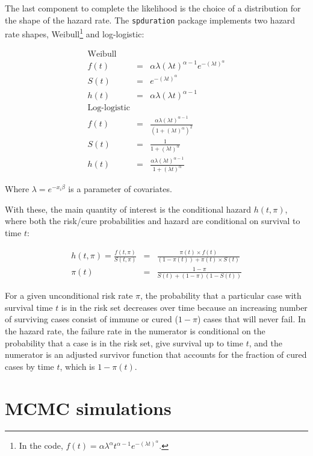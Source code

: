 \documentclass[letter]{article}
\begin{document}
The last component to complete the likelihood is the choice of a distribution for the shape of the hazard rate. The \texttt{spduration} package implements two hazard rate shapes, Weibull\footnote{In the code, $f(t) = \alpha \lambda^{\alpha} t^{\alpha - 1} e^{-(\lambda t)^\alpha}$.} and log-logistic:

\begin{eqnarray*}
\textrm{Weibull} \\
 f(t) & = & \alpha \lambda (\lambda t)^{\alpha - 1} e^{-(\lambda t)^\alpha} \\
  S(t) & = & e^{ -(\lambda t )^\alpha } \\
 h(t) & = & \alpha \lambda (\lambda t)^{\alpha-1} \\
\textrm{Log-logistic} \\
 f(t) & = & \frac{ \alpha \lambda (\lambda t)^{\alpha-1} }{ (1 + (\lambda t)^\alpha)^2 } \\
 S(t) & = & \frac{1}{ 1+  (\lambda t)^\alpha }  \\
 h(t) & = & \frac{ \alpha \lambda (\lambda t)^{\alpha-1} }{ 1+  (\lambda t)^\alpha }
\end{eqnarray*}

Where $\lambda = e^{-x_i\beta}$ is a parameter of covariates.

With these, the main quantity of interest is the conditional hazard $h(t, \pi)$, where both the risk/cure probabilities and hazard are conditional on survival to time $t$:

\begin{eqnarray}
h(t, \pi) = \frac{f(t, \pi)}{S(t, \pi)} & = & \frac{ \pi(t) \times f(t) }{ (1-\pi(t)) + \pi(t) \times S(t) } \\
 \pi(t) & = & \frac{ 1-\pi }{ S(t) + (1-\pi) (1 - S(t)) }
\end{eqnarray}

For a given unconditional risk rate $\pi$, the probability that a particular case with survival time $t$ is in the risk set decreases over time because an increasing number of surviving cases consist of immune or cured ($1-\pi$) cases that will never fail. In the hazard rate, the failure rate in the numerator is conditional on the probability that a case is in the risk set, give survival up to time $t$, and the numerator is an adjusted survivor function that accounts for the fraction of cured cases by time $t$, which is $1-\pi(t)$. 

%
%
%
\section{MCMC simulations}
\end{document}
